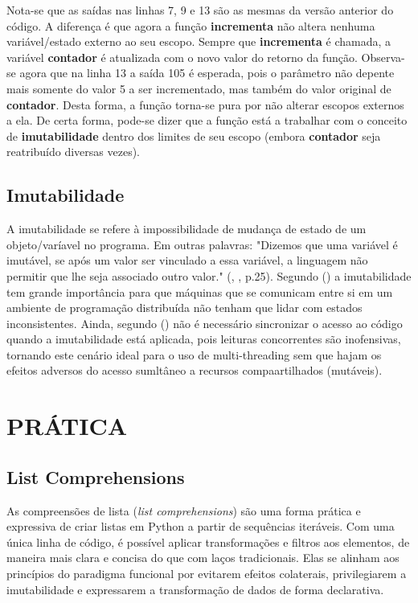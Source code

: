 \documentclass[date,twocolumn,a4paper]{ppgem}
\begin{document}
    Nota-se que as saídas nas linhas 7, 9 e 13 são as mesmas da versão anterior do código. A diferença é que agora a função
    \textbf{incrementa} não altera nenhuma variável/estado externo ao seu escopo. Sempre que \textbf{incrementa} é chamada,
    a variável \textbf{contador} é atualizada com o novo valor do retorno da função. Observa-se agora que na linha 13 a saída
    105 é esperada, pois o parâmetro não depente mais somente do valor 5 a ser incrementado, mas também do valor original de
    \textbf{contador}.
    Desta forma, a função torna-se pura por não alterar escopos externos a ela. De certa forma, pode-se dizer que a função está a trabalhar
    com o conceito de \textbf{imutabilidade} dentro dos limites de seu escopo (embora \textbf{contador} seja reatribuído diversas vezes).

    \subsection{Imutabilidade}
        A imutabilidade se refere à impossibilidade de mudança de estado de um objeto/varíavel no programa. Em outras palavras: "Dizemos que uma variável é imutável, se após um valor ser vinculado a essa variável, a linguagem não permitir que lhe seja associado outro valor." (\citeauthor{queiroz_func_prog}, \citeyear{queiroz_func_prog}, p.25).\linebreak
        Segundo \citeauthor{queiroz_func_prog} (\citeyear{queiroz_func_prog}) a imutabilidade tem grande importância para que máquinas que se comunicam entre
        si em um ambiente de programação distribuída não tenham que lidar com estados inconsistentes.\linebreak
        Ainda, segundo \citeauthor{goncalves_func_prog} (\citeyear{goncalves_func_prog}) não é necessário sincronizar o acesso ao código quando a imutabilidade está aplicada, pois leituras concorrentes são inofensivas, tornando este cenário ideal para o uso de multi-threading sem que hajam os efeitos adversos
        do acesso sumltâneo a recursos compaartilhados (mutáveis).
    
    
    \section{PRÁTICA}

    \subsection{List Comprehensions}
    As compreensões de lista (\textit{list comprehensions}) são uma forma prática e expressiva de criar listas em Python a partir de sequências iteráveis. Com uma única linha de código, é possível aplicar transformações e filtros aos elementos, de maneira mais clara e concisa do que com laços tradicionais. Elas se alinham aos princípios do paradigma funcional por evitarem efeitos colaterais, privilegiarem a imutabilidade e expressarem a transformação de dados de forma declarativa.
\end{document}
